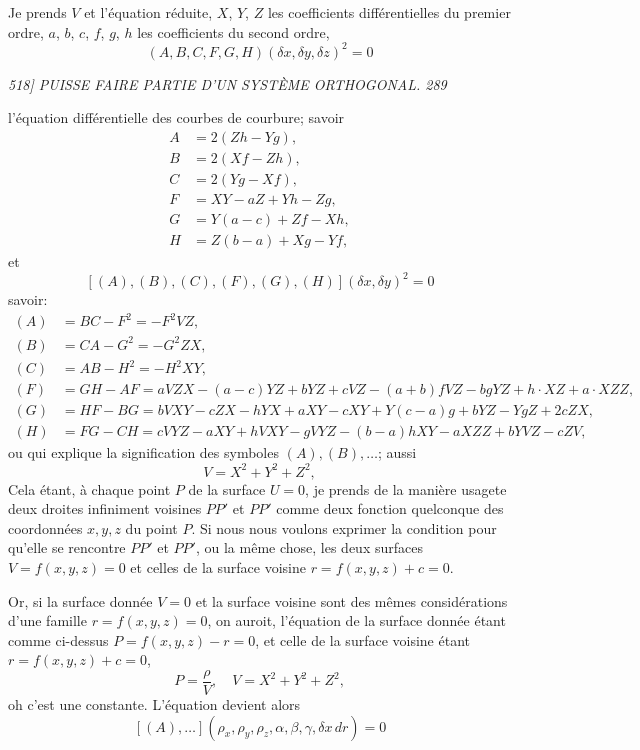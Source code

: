 \documentclass[11pt,a4paper]{book}
\begin{document}
\medskip

Je prends $V$ et l'\'equation r\'eduite, $X$, $Y$, $Z$ les coefficients diff\'erentielles du
premier ordre, $a$, $b$, $c$, $f$, $g$, $h$ les coefficients du second ordre,
\[
(A, B, C, F, G, H)(\delta x, \delta y, \delta z)^2 = 0
\]

\clearpage

\noindent\textit{518] \hfill PUISSE FAIRE PARTIE D'UN SYST\`EME ORTHOGONAL. \hfill 289}

\medskip

l'\'equation diff\'erentielle des courbes de courbure; savoir
\begin{align*}
A &= 2(Zh - Yg), \\
B &= 2(Xf - Zh), \\
C &= 2(Yg - Xf), \\
F &= XY - aZ + Yh - Zg, \\
G &= Y(a - c) + Zf - Xh, \\
H &= Z(b - a) + Xg - Yf,
\end{align*}
et
\[
[(A), (B), (C), (F), (G), (H)](\delta x, \delta y)^2 = 0
\]
savoir:
\begin{align*}
(A) &= BC - F^2 = -F^2 V Z, \\
(B) &= CA - G^2 = -G^2 ZX, \\
(C) &= AB - H^2 = -H^2 XY, \\
(F) &= GH - AF = aV ZX - (a - c)Y Z + b YZ + cVZ - (a + b)f V Z - bgY Z + h \cdot XZ + a \cdot XZ Z, \\
(G) &= HF - BG = bV X Y - cZ X - h YX + a XY - cX Y + Y(c - a)g + bY Z - Y g Z + 2cZ X,\\
(H) &= FG - CH = cV Y Z - aXY + h V XY - g V YZ - (b - a)hX Y - aXZ Z + bY V Z - cZ V,
\end{align*}
ou qui explique la signification des symboles $(A), (B), \ldots$; aussi
\[
V = X^2 + Y^2 + Z^2,
\]
Cela \'etant, \`a chaque point $P$ de la surface $U = 0$, je prends de la mani\`ere usagete
deux droites infiniment voisines $PP'$ et $PP'$ comme deux fonction quelconque des coordonn\'ees $x, y, z$ du point $P$. Si nous nous voulons exprimer la condition pour
qu'elle se rencontre $PP'$ et $PP'$, ou la m\^eme chose, les deux surfaces $V = f(x, y, z) = 0$
et celles de la surface voisine $r = f(x, y, z) + c = 0$.

\medskip

Or, si la surface donn\'ee $V = 0$ et la surface voisine sont des m\^emes consid\'erations d'une
famille $r = f(x, y, z) = 0$, on auroit, l'\'equation de la surface donn\'ee \'etant comme ci-dessus
$P = f(x, y, z) - r = 0$, et celle de la surface voisine \'etant $r = f(x, y, z) + c = 0$,
\[
P = \frac{\rho}{V}, \quad V = X^2 + Y^2 + Z^2,
\]
oh c'est une constante. L'\'equation devient alors
\[
[(A), \ldots](\rho_x, \rho_y, \rho_z, \alpha, \beta, \gamma, \delta x \, dr) = 0
\]
\end{document}
